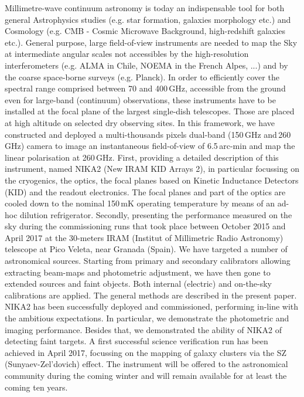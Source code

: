 \documentclass[]{aa} %
\begin{document}
  \abstract
   {Millimetre-wave continuum astronomy is today an indispensable tool for both general Astrophysics studies (e.g. star formation, galaxies morphology etc.) and Cosmology (e.g. CMB - Cosmic Microwave Background, high-redshift galaxies etc.). General purpose, large field-of-view instruments are needed to map the Sky at intermediate angular scales not accessibles by the high-resolution interferometers (e.g. ALMA in Chile, NOEMA in the French Alpes, ...) and by the coarse space-borne surveys (e.g. Planck). In order to efficiently cover the spectral range comprised between 70 and 400\,GHz, accessible from the ground even for large-band (continuum) observations, these instruments have to be installed at the focal plane of the largest single-dish telescopes. Those are placed at high altitude on selected dry observing sites. In this framework, we have constructed and deployed a multi-thousands pixels dual-band (150\,GHz and\,260 GHz) camera to image an instantaneous field-of-view of 6.5\,arc-min and map the linear polarisation at 260\,GHz.}
   {First, providing a detailed description of this instrument, named NIKA2 (New IRAM KID Arrays 2), in particular focussing on the cryogenics, the optics, the focal planes based on Kinetic Inductance Detectors (KID) and the readout electronics. The focal planes and part of the optics are cooled down to the nominal 150\,mK operating temperature by means of an ad-hoc dilution refrigerator. 
Secondly, presenting the performance measured on the sky during the commissioning runs that took place between October 2015 and April 2017 at the 30-meters IRAM (Institut of Millimetric Radio Astronomy) telescope at Pico Veleta, near Granada (Spain).}
   {We have targeted a number of astronomical sources. Starting from primary and secondary calibrators allowing extracting beam-maps and photometric adjustment, we have then gone to extended sources and faint objects. Both internal (electric) and on-the-sky calibrations are applied. The general methods are described in the present paper.}
   {NIKA2 has been successfully deployed and commissioned, performing in-line with the ambitious expectations. In particular, we demonstrate the photometric and imaging performance. Besides that, we demonstrated the ability of NIKA2 of detecting faint targets. A first successful science verification run has been achieved in April 2017, focussing on the mapping of galaxy clusters via the SZ (Sunyaev-Zel\textquoteright dovich) effect. The instrument will be offered to the astronomical community during the coming winter and will remain available for at least the coming ten years.}
  {}
\end{document}

